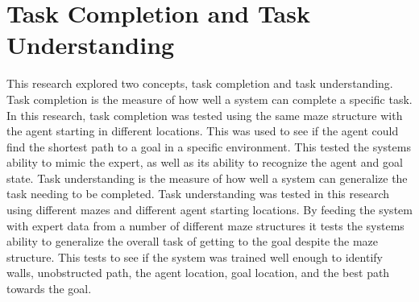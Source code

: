\documentclass[12pt,american]{report}
\begin{document}
\section{Task Completion and Task Understanding}
This research explored two concepts, task completion and task understanding. Task completion is the measure of how well a system can complete a specific task.  In this research, task completion was tested using the same maze structure with the agent starting in different locations.  This was used to see if the agent could find the shortest path to a goal in a specific environment.  This tested the systems ability to mimic the expert, as well as its ability to recognize the agent and goal state.  
Task understanding is the measure of how well a system can generalize the task needing to be completed. Task understanding was tested in this research using different mazes and different agent starting locations.  By feeding the system with expert data from a number of different maze structures it tests the systems ability to generalize the overall task of getting to the goal despite the maze structure.  This tests to see if the system was trained well enough to identify walls, unobstructed path, the agent location, goal location, and the best path towards the goal.
\end{document}
